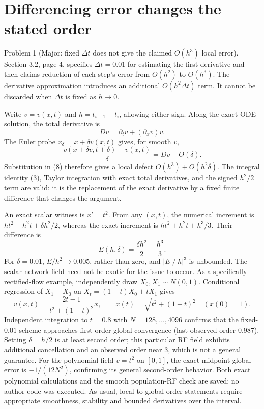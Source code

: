 \documentclass[10pt]{article}
\begin{document}
\section*{Differencing error changes the stated order}
Problem 1 (Major: fixed \(\Delta t\) does not give the claimed \(O(h^3)\) local error).  Section 3.2, page 4, specifies \(\Delta t=0.01\) for estimating the first derivative and then claims reduction of each step’s error from \(O(h^2)\) to \(O(h^3)\). The derivative approximation introduces an additional \(O(h^2\Delta t)\) term. It cannot be discarded when \(\Delta t\) is fixed as \(h\to0\).\par
Write \(v=v(x,t)\) and \(h=t_{i-1}-t_i\), allowing either sign. Along the exact ODE solution, the total derivative is \[Dv=\partial_t v+(\partial_xv)v.\] The Euler probe \(x_\delta=x+\delta v(x,t)\) gives, for smooth \(v\), \[\frac{v(x+\delta v,t+\delta)-v(x,t)}\delta=Dv+O(\delta).\] Substitution in (8) therefore gives a local defect \(O(h^3)+O(h^2\delta)\). The integral identity (3), Taylor integration with exact total derivatives, and the signed \(h^2/2\) term are valid; it is the replacement of the exact derivative by a fixed finite difference that changes the argument.\par
An exact scalar witness is \(x'=t^2\). From any \((x,t)\), the numerical increment is \(ht^2+h^2t+\delta h^2/2\), whereas the exact increment is \(ht^2+h^2t+h^3/3\). Their difference is \[E(h,\delta)=\frac{\delta h^2}{2}-\frac{h^3}{3}.\] For \(\delta=0.01\), \(E/h^2\to0.005\), rather than zero, and \(|E|/|h|^3\) is unbounded. The scalar network field need not be exotic for the issue to occur. As a specifically rectified-flow example, independently draw \(X_0,X_1\sim N(0,1)\). Conditional regression of \(X_1-X_0\) on \(X_t=(1-t)X_0+tX_1\) gives \[v(x,t)=\frac{2t-1}{t^2+(1-t)^2}x,
 \qquad x(t)=\sqrt{t^2+(1-t)^2}\quad(x(0)=1).\] Independent integration to \(t=0.8\) with \(N=128,\ldots,4096\) confirms that the fixed-\(0.01\) scheme approaches first-order global convergence (last observed order \(0.987\)). Setting \(\delta=h/2\) is at least second order; this particular RF field exhibits additional cancellation and an observed order near 3, which is not a general guarantee. For the polynomial field \(v=t^2\) on \([0,1]\), the exact midpoint global error is \(-1/(12N^2)\), confirming its general second-order behavior. Both exact polynomial calculations and the smooth population-RF check are saved; no author code was executed. As usual, local-to-global order statements require appropriate smoothness, stability and bounded derivatives over the interval.\par
\end{document}
